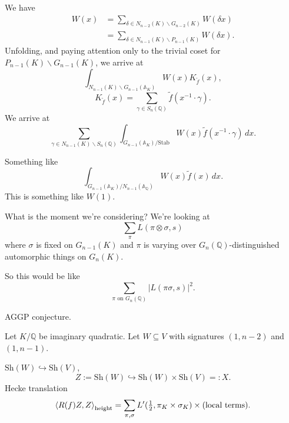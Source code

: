 \documentclass[reqno]{amsart} 
\begin{document}
We have
\begin{align*}
  W(x) &= \sum_{\delta \in N_{n - 2}(K) \backslash G_{n - 2}(K)} W(\delta x) \\
       &= \sum_{\delta \in N_{n - 1}(K) \backslash P_{n - 1}(K)} W(\delta x).
\end{align*}
Unfolding, and paying attention only to the trivial coset for $P_{n-1}(K) \backslash G_{n-1}(K)$, we arrive at
\begin{equation*}
  \int_{N_{n - 1}(K) \backslash G_{n - 1}(\mathbb{A}_K)}
  W(x) K_{\tilde{f}}(x),
\end{equation*}
\begin{equation*}
K_{\tilde{f}}(x) = \sum_{\gamma \in S_n(\mathbb{Q})} \tilde{f}(x^{-1} \cdot \gamma).
\end{equation*}
We arrive at
\begin{equation*}
  \sum_{\gamma \in N_{n - 1}(K) \backslash S_n(\mathbb{Q})}
  \int_{G_{n - 1}(\mathbb{A}_K) / \mathrm{Stab}}
  W(x) \tilde{f}(x^{-1} \cdot \gamma) \, d x.
\end{equation*}

Something like
\begin{equation*}
\int_{G_{n - 1}(\mathbb{A}_K) / N_{n - 1}(\mathbb{A}_{\mathbb{Q}})} W(x) \tilde{f}(x) \, d x.
\end{equation*}
This is something like $W(1)$.

What is the moment we're considering?  We're looking at
\begin{equation*}
  \sum_{\pi } L(\pi \otimes \sigma, s)
\end{equation*}
where $\sigma$ is fixed on $G_{n-1}(K)$ and $\pi$ is varying over $G_n(\mathbb{Q})$-distinguished automorphic things on $G_n(K)$.

So this would be like
\begin{equation*}
  \sum_{\pi \text{ on } G_n(\mathbb{Q})}
  \lvert L(\pi \sigma, s ) \rvert^2.
\end{equation*}


AGGP conjecture.

Let $K /\mathbb{Q}$ be imaginary quadratic.  Let $W \subseteq V$ with signatures $(1, n - 2)$ and $(1, n - 1)$.

$\mathrm{Sh}(W) \hookrightarrow \mathrm{Sh}(V)$,
\begin{equation*}
  Z := \mathrm{Sh}(W) \hookrightarrow \mathrm{Sh}(W) \times \mathrm{Sh}(V) =: X.
\end{equation*}
Hecke translation
\begin{equation*}
\left\langle R(f) Z, Z \right\rangle_{\operatorname{height}} = \sum_{\pi, \sigma} L '(\tfrac{1}{2}, \pi_K \times \sigma_K ) \times (\text{local terms}).
\end{equation*}
\end{document}

